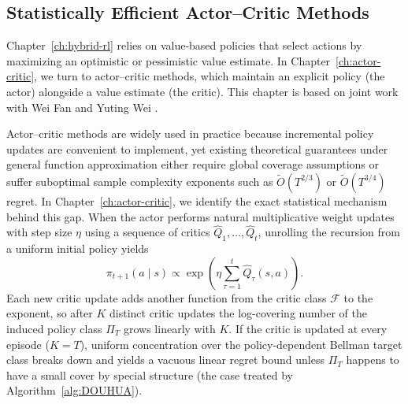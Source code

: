 \begin{aigenblock}
\subsection{Statistically Efficient Actor--Critic Methods}

Chapter~\ref{ch:hybrid-rl} relies on value-based policies that select actions by maximizing an optimistic or pessimistic value estimate. In Chapter~\ref{ch:actor-critic}, we turn to actor--critic methods, which maintain an explicit policy (the actor) alongside a value estimate (the critic). This chapter is based on joint work with Wei Fan and Yuting Wei \citep{tan2025actor}.

Actor--critic methods are widely used in practice because incremental policy updates are convenient to implement, yet existing theoretical guarantees under general function approximation either require global coverage assumptions or suffer suboptimal sample complexity exponents such as $\widetilde{O}(T^{2/3})$ or $\widetilde{O}(T^{3/4})$ regret. In Chapter~\ref{ch:actor-critic}, we identify the exact statistical mechanism behind this gap. When the actor performs natural multiplicative weight updates with step size $\eta$ using a sequence of critics $\widehat{Q}_1, \dots, \widehat{Q}_t$, unrolling the recursion from a uniform initial policy yields
\begin{equation}
\label{eq:intro-ac-unroll}
\pi_{t+1}(a \mid s) \propto \exp\!\left( \eta \sum_{\tau=1}^t \widehat{Q}_\tau(s,a) \right).
\end{equation}
Each new critic update adds another function from the critic class $\mathcal{F}$ to the exponent, so after $K$ distinct critic updates the log-covering number of the induced policy class $\Pi_T$ grows linearly with $K$. If the critic is updated at every episode ($K = T$), uniform concentration over the policy-dependent Bellman target class breaks down and yields a vacuous linear regret bound unless $\Pi_T$ happens to have a small cover by special structure (the case treated by Algorithm~\ref{alg:DOUHUA}).


\end{aigenblock}
